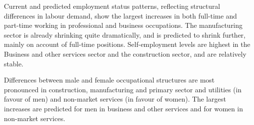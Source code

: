 \documentclass[11 pt, a4paper]{report}
\begin{document}
Current and predicted employment status patterns, reflecting structural differences in labour demand, show the largest increases in both full-time and part-time working in professional and business occupations. The manufacturing sector is already shrinking quite dramatically, and is predicted to shrink further, mainly on account of full-time positions. Self-employment levels are highest in the Business and other services sector and the construction sector,  and are relatively stable. 

Differences between male and female occupational structures are most pronounced in construction, manufacturing and primary sector and utilities (in favour of men) and non-market services (in favour of women). The largest increases are predicted for men in business and other services and for women in non-market services. 
\end{document}
